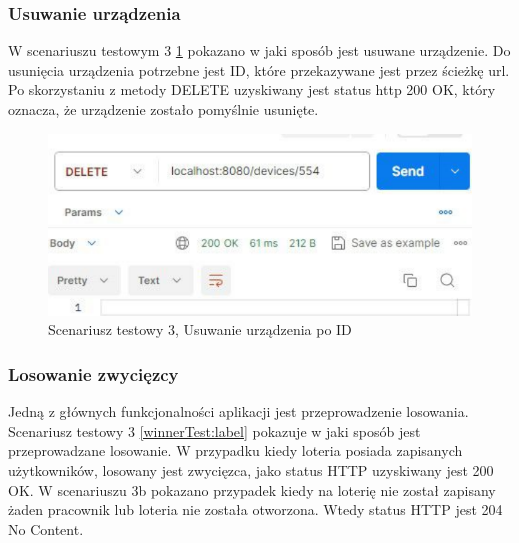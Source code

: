 \subsubsection{Usuwanie urządzenia}
W scenariuszu testowym 3 \ref{deleteTest:label} pokazano w jaki sposób jest usuwane urządzenie. Do usunięcia urządzenia potrzebne jest ID, które przekazywane jest przez ścieżkę url. Po skorzystaniu z metody DELETE uzyskiwany jest status http 200 OK, który oznacza, że urządzenie zostało pomyślnie usunięte.


\begin{figure}[h]
		\centering
    \includegraphics[width=0.45\linewidth]{rys06/postmanTest/delete.pdf}
    \caption{Scenariusz testowy 3, Usuwanie urządzenia po ID}
    \label{deleteTest:label}
\end{figure}


\subsubsection{Losowanie zwycięzcy}

Jedną z głównych funkcjonalności aplikacji jest przeprowadzenie losowania. Scenariusz testowy 3 \ref{winnerTest:label} pokazuje w jaki sposób jest przeprowadzane losowanie. W przypadku kiedy loteria posiada zapisanych użytkowników, losowany jest zwycięzca, jako status HTTP uzyskiwany jest 200 OK. W scenariuszu 3b pokazano przypadek kiedy na loterię nie został zapisany żaden pracownik lub loteria nie została otworzona. Wtedy status HTTP jest 204 No Content. 


